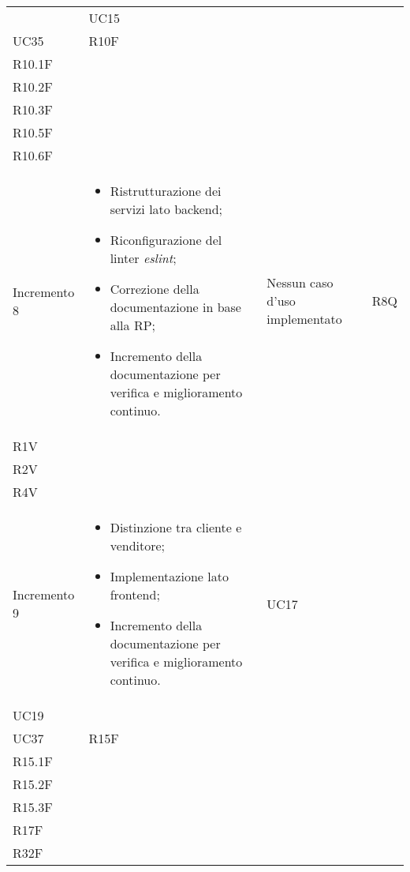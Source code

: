 \begin{longtable}{
    >{\centering}p{}
    >{\raggedright}p{}
    >{\centering}p{}
    >{\centering}p{}
    }
                                  & UC15                                                                                           \\ UC35                                                                 & R10F                                                                                                       \\ R10.1F \\ R10.2F \\ R10.3F \\ R10.5F\\ R10.6F
    \tabularnewline

    Incremento 8
                                  &
    \vspace{-15px}
    \begin{itemize}
        \renewcommand\labelitemi{-}
        \item Ristrutturazione dei servizi lato backend;
        \item Riconfigurazione del linter \textit{eslint};
        \item Correzione della documentazione in base alla RP;
        \item Incremento della documentazione per verifica e miglioramento continuo.
    \end{itemize}
                                  & Nessun caso d'uso implementato & R8Q                                                           \\ R1V \\ R2V \\ R4V    \tabularnewline

    Incremento 9                  &
    \vspace{-15px}
    \begin{itemize}
        \renewcommand\labelitemi{-}
        \item Distinzione tra cliente e venditore;
        \item Implementazione lato frontend;
        \item Incremento della documentazione per verifica e miglioramento continuo.
    \end{itemize}
                                  & UC17                                                                                           \\ UC19  \\ UC37
                                  & R15F                                                                                           \\ R15.1F \\ R15.2F \\ R15.3F \\ R17F \\ R32F
    \tabularnewline


\end{longtable}
